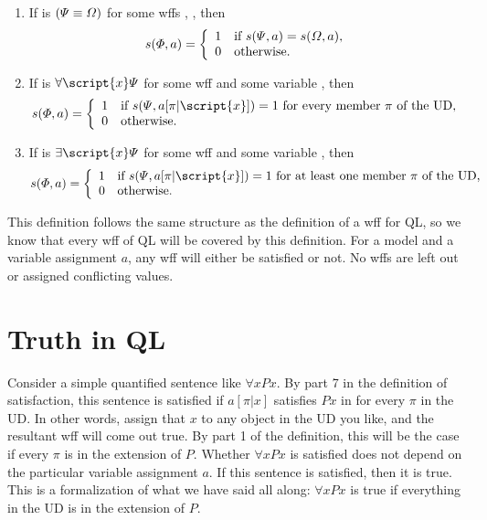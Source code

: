 \begin{enumerate}
\item If \metaA{} is $(\varPsi{}\equiv\varOmega{})$ for some wffs \metaA{}, \metaB{}, then
\begin{displaymath}s(\varPhi{}, a) =
	\left\{\begin{array}{ll}
	1 & \mbox{if $s(\varPsi{}, a) = s(\varOmega{}, a)$},\\
	0 & \mbox{otherwise.}
	\end{array}\right.
\end{displaymath}

\item If \metaA{} is $\forall\script{x} \metaB{}$ for some wff \metaB{} and some variable , then
\begin{displaymath}s(\metaA{}, a) =
	\left\{\begin{array}{ll}
	1 & \mbox{if $s(\metaB{}, a[\pi|\script{x}])=1$ for every member $\pi$ of the UD},\\
	0 & \mbox{otherwise.}
	\end{array}\right.
\end{displaymath}

\item If \metaA{} is $\exists\script{x} \metaB{}$ for some wff \metaB{} and some variable , then
\begin{displaymath}s(\metaA{}, a) =
	\left\{\begin{array}{ll}
	1 & \mbox{if $s(\metaB{}, a[\pi|\script{x}])=1$ for at least one member $\pi$ of the UD},\\
	0 & \mbox{otherwise.}
	\end{array}\right.
\end{displaymath}
\end{enumerate}
 
This definition follows the same structure as the definition of a wff for QL, so we know that every wff of QL will be covered by this definition. For a model  and a variable assignment $a$, any wff will either be satisfied or not. No wffs are left out or assigned conflicting values.




\section{Truth in QL}

Consider a simple quantified sentence like $\forall xPx$. By part 7 in the definition of satisfaction, this sentence is satisfied if $a[\pi|x]$ satisfies $Px$ in  for every $\pi$ in the UD. In other words, assign that $x$ to any object in the UD you like, and the resultant wff will come out true. By part 1 of the definition, this will be the case if every $\pi$ is in the extension of $P$. Whether $\forall xPx$ is satisfied does not depend on the particular variable assignment $a$. If this sentence is satisfied, then it is true. This is a formalization of what we have said all along: $\forall xPx$ is true if everything in the UD is in the extension of $P$.

